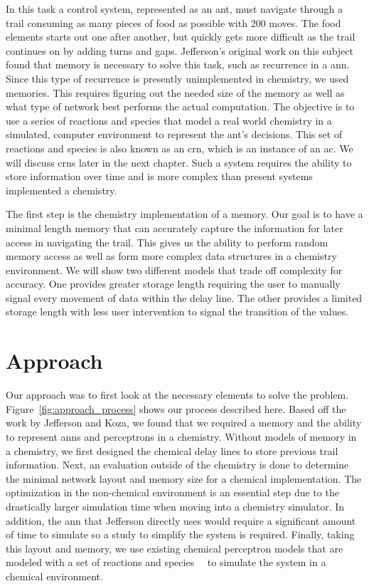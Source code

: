 In this task a control system, represented as an ant, must navigate through a trail consuming as many pieces of food as possible with 200 moves. The food elements starts out one after another, but quickly gets more difficult as the trail continues on by adding turns and gaps. Jefferson's original work on this subject found that memory is necessary to solve this task, such as recurrence in a \gls{ann}. Since this type of recurrence is presently unimplemented in chemistry, we used memories. This requires figuring out the needed size of the memory as well as what type of network best performs the actual computation. The objective is to use a series of reactions and species that model a real world chemistry in a simulated, computer environment to represent the ant's decisions. This set of reactions and species is also known as an \gls{crn}, which is an instance of an \gls{ac}. We will discuss \glspl{crn} later in the next chapter. Such a system requires the ability to store information over time and is more complex than present systems implemented a chemistry. 

The first step is the chemistry implementation of a memory. Our goal is to have a minimal length memory that can accurately capture the information for later access in navigating the trail. This gives us the ability to perform random memory access as well as form more complex data structures in a chemistry environment. We will show two different models that trade off complexity for accuracy. One provides greater storage length requiring the user to manually signal every movement of data within the delay line. The other provides a limited storage length with less user intervention to signal the transition of the values.

\section{Approach}
Our approach was to first look at the necessary elements to solve the problem. Figure~\ref{fig:approach_process} shows our process described here. Based off the work by Jefferson and Koza, we found that we required a memory and the ability to represent \glspl{ann} and perceptrons in a chemistry. Without models of memory in a chemistry, we first designed the chemical delay lines to store previous trail information. Next, an evaluation outside of the chemistry is done to determine the minimal network layout and memory size for a chemical implementation. The optimization in the non-chemical environment is an essential step due to the drastically larger simulation time when moving into a chemistry simulator. In addition, the \gls{ann} that Jefferson directly uses would require a significant amount of time to simulate so a study to simplify the system is required. Finally, taking this layout and memory, we use existing chemical perceptron models that are modeled with a set of reactions and species~\cite{Banda2014-kg}~\cite{Blount_undated-ro} to simulate the system in a chemical environment. 

